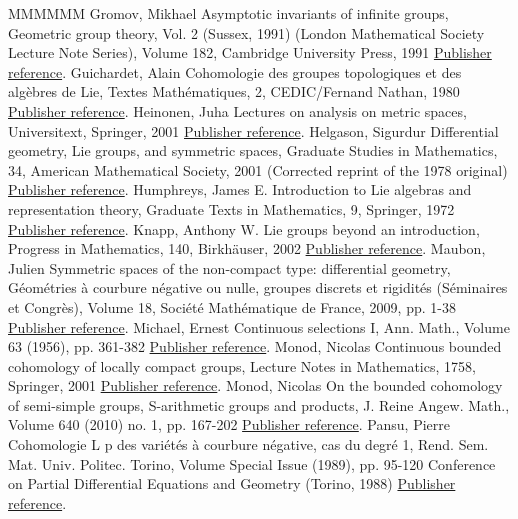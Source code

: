 \documentclass[11pt]{article}
\theoremstyle{definition}
\numberwithin{equation}{section}
\numberwithin{figure}{section}
\numberwithin{table}{section}
\begin{document}
\begin{thebibliography}{MMMMMM}
 Gromov, Mikhael Asymptotic invariants of infinite groups, Geometric group theory, Vol. 2 (Sussex, 1991) (London Mathematical Society Lecture Note Series), Volume 182, Cambridge University Press, 1991 \href{https://ahl.centre-mersenne.org/item/AHL_2020__3__1291_0/#G}{Publisher reference}.
 Guichardet, Alain Cohomologie des groupes topologiques et des algèbres de Lie, Textes Mathématiques, 2, CEDIC/Fernand Nathan, 1980 \href{https://ahl.centre-mersenne.org/item/AHL_2020__3__1291_0/#Gui}{Publisher reference}.
 Heinonen, Juha Lectures on analysis on metric spaces, Universitext, Springer, 2001 \href{https://ahl.centre-mersenne.org/item/AHL_2020__3__1291_0/#Hei}{Publisher reference}.
 Helgason, Sigurdur Differential geometry, Lie groups, and symmetric spaces, Graduate Studies in Mathematics, 34, American Mathematical Society, 2001 (Corrected reprint of the 1978 original) \href{https://ahl.centre-mersenne.org/item/AHL_2020__3__1291_0/#Helgason}{Publisher reference}.
 Humphreys, James E. Introduction to Lie algebras and representation theory, Graduate Texts in Mathematics, 9, Springer, 1972 \href{https://ahl.centre-mersenne.org/item/AHL_2020__3__1291_0/#Humphreys-LA}{Publisher reference}.
 Knapp, Anthony W. Lie groups beyond an introduction, Progress in Mathematics, 140, Birkhäuser, 2002 \href{https://ahl.centre-mersenne.org/item/AHL_2020__3__1291_0/#Knapp}{Publisher reference}.
 Maubon, Julien Symmetric spaces of the non-compact type: differential geometry, Géométries à courbure négative ou nulle, groupes discrets et rigidités (Séminaires et Congrès), Volume 18, Société Mathématique de France, 2009, pp. 1-38 \href{https://ahl.centre-mersenne.org/item/AHL_2020__3__1291_0/#Maubon}{Publisher reference}.
 Michael, Ernest Continuous selections I, Ann. Math., Volume 63 (1956), pp. 361-382 \href{https://ahl.centre-mersenne.org/item/AHL_2020__3__1291_0/#Mi}{Publisher reference}.
 Monod, Nicolas Continuous bounded cohomology of locally compact groups, Lecture Notes in Mathematics, 1758, Springer, 2001 \href{https://ahl.centre-mersenne.org/item/AHL_2020__3__1291_0/#Monod_LNM}{Publisher reference}.
 Monod, Nicolas On the bounded cohomology of semi-simple groups, S-arithmetic groups and products, J. Reine Angew. Math., Volume 640 (2010) no. 1, pp. 167-202 \href{https://ahl.centre-mersenne.org/item/AHL_2020__3__1291_0/#Monod}{Publisher reference}.
 Pansu, Pierre Cohomologie L p  des variétés à courbure négative, cas du degré 1, Rend. Sem. Mat. Univ. Politec. Torino, Volume Special Issue (1989), pp. 95-120 Conference on Partial Differential Equations and Geometry (Torino, 1988) \href{https://ahl.centre-mersenne.org/item/AHL_2020__3__1291_0/#Pa1}{Publisher reference}.

\end{thebibliography}
\end{document}
